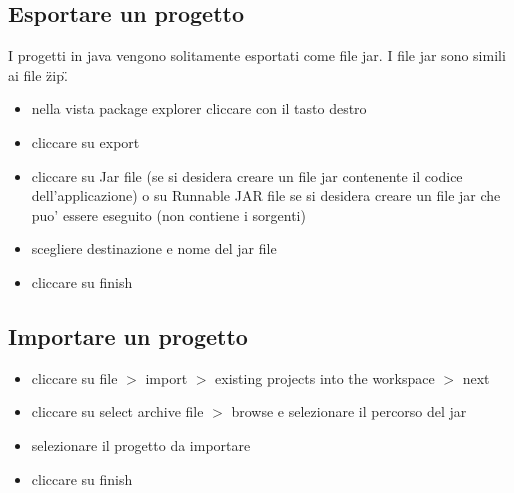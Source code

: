 \documentclass{article}
\begin{document}
\subsection{Esportare un progetto}
I progetti in java vengono solitamente esportati come file jar. I file jar sono simili ai file \"zip\".
\begin{itemize}
\item nella vista package explorer cliccare con il tasto destro
\item cliccare su export
\item cliccare su Jar file (se si desidera creare un file jar contenente il codice dell'applicazione) o su Runnable JAR file se si desidera creare un file jar che puo' essere eseguito (non contiene i sorgenti)
\item scegliere destinazione e nome del jar file
\item cliccare su finish
\end{itemize}

\subsection{Importare un progetto}
\begin{itemize}
\item cliccare su file $>$ import  $>$ existing projects into the workspace  $>$ next 
\item cliccare su select archive file  $>$  browse e selezionare il percorso del jar
\item selezionare il progetto da importare
\item cliccare su finish
\end{itemize}
\end{document}
